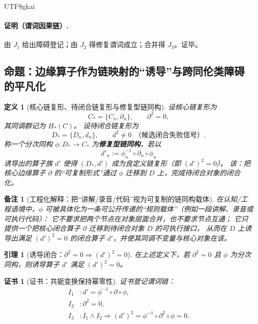 \documentclass[12pt]{article}
\newtheorem{definition}{定义}[section]
\newtheorem{lemma}{引理}[section]
\newtheorem{remark}{备注}[section]
\newtheorem{Certificate}{证书}[section]
\newcommand{\KouJing}{\texorpdfstring{表述约定}{表述约定}}
\begin{document}
\begin{CJK*}{UTF8}{gkai}
\paragraph{证明（谓词因果链）.}
由 $J_1$ 给出障碍登记；由 $J_2$ 得修复谓词成立；合并得 $J_3$。证毕。

\subsection{命题：边缘算子作为链映射的“诱导”与跨同伦类障碍的平凡化}
\label{subsec:tex29-ch16-chainmap}

\begin{definition}[核心链复形、待闭合链复形与修复型链同构]
设核心链复形为
\[
  C_*=\{C_n,\partial_n\},\qquad \partial^2=0,
\]
其同调群记为 $H_*(C)$。
设待闭合链复形为
\[
  D_*=\{D_n,d_n\},\qquad d^2\neq 0\ \ \text{（候选闭合失败信号）}.
\]
称一个分次同构 $\phi:D_*\to C_*$ 为\textbf{修复型链同构}，若以
\[
  d'_n:=\phi_n^{-1}\circ \partial_n\circ \phi_n
\]
诱导出的算子族 $d'$ 使得 $(D_*,d')$ 成为良定义链复形（即 $(d')^2=0$）。
该：把核心边缘算子 $\partial$ 的“可复制形式”通过 $\phi$ 迁移到 $D$ 上，完成待闭合对象的闭合化。
\end{definition}

\begin{remark}[工程化解释：把“讲解/录音/代码”视为可复制的链同构载体]
在认知/工程语境中，$\phi$ 可被具体化为一条可公开传递的“规则载体”（例如一段讲解、录音或可执行代码）：
它不要求把两个节点在对象层面合并，也不要求节点互通；
它只提供一个把核心闭合算子 $\partial$ 迁移到待闭合对象 $D$ 的可执行接口，
从而在 $D$ 上诱导出满足 $(d')^2=0$ 的闭合算子 $d'$，并使其同调不变量与核心对象在该。
\end{remark}

\begin{lemma}[诱导闭合：$\partial^2=0\Rightarrow (d')^2=0$]
\label{lem:tex29-ch16-induced-closure}
在上述定义下，若 $\partial^2=0$ 且 $\phi$ 为分次同构，则诱导算子 $d'$ 满足 $(d')^2=0$。
\end{lemma}

\begin{Certificate}[证书：共轭变换保持幂零性]
\label{cert:tex29-ch16-induced-closure}
证书登记谓词链：
\[
\begin{aligned}
  I_1 &: d'=\phi^{-1}\circ \partial\circ \phi,\\
  I_2 &: \partial^2=0,\\
  I_3 &: I_1\wedge I_2\Rightarrow (d')^2=\phi^{-1}\circ \partial^2\circ \phi=0.
\end{aligned}
\]
\end{Certificate}


\end{CJK*}
\end{document}
